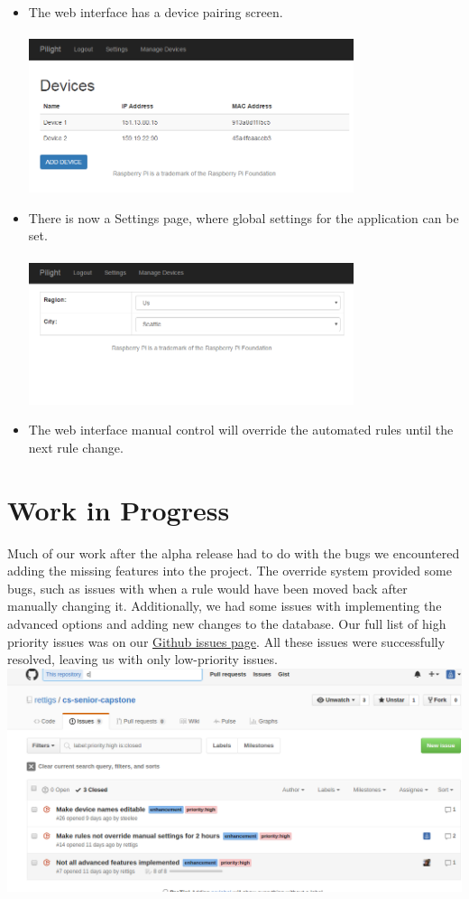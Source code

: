\documentclass[10pt,draftclsnofoot,onecolumn]{IEEEtran}
\begin{document}
\begin{itemize}
    \item The web interface has a device pairing screen. \\ \\
      \includegraphics[width=0.75\textwidth]{devices-page.png}
    \item There is now a Settings page, where global settings for the application can be set. \\ \\
      \includegraphics[width=0.75\textwidth]{settings-page.png}
    \item The web interface manual control will override the automated rules
         until the next rule change.
\end{itemize}

\section{Work in Progress}
Much of our work after the alpha release had to do with the
bugs we encountered adding the missing features into the
project. The override system provided some bugs, such as
issues with when a rule would have been moved back after manually
changing it. Additionally, we had some issues with implementing
the advanced options and adding new changes to the database. Our full
list of high priority issues was on our \href{https://github.com/rettigs/cs-senior-capstone/issues}{Github issues page}. All these issues were
successfully resolved, leaving us with only low-priority issues.\\
\includegraphics[width=1.0\textwidth]{github-issues.png}
\end{document}
